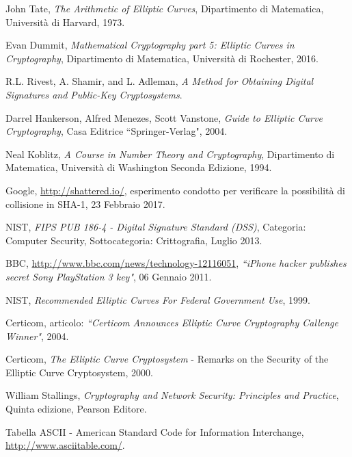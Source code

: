 \documentclass[a4paper,12pt]{tesiinfo}
\begin{document}
\begin{thebibliography}{99}
  John Tate,
  \emph{The Arithmetic of Elliptic Curves},
   Dipartimento di Matematica,
   Universit\`a di Harvard,
  1973.
  
  Evan Dummit,
  \emph{Mathematical Cryptography part 5: Elliptic Curves in Cryptography},
   Dipartimento di Matematica,
   Universit\`a di Rochester,
  2016.
  
  R.L. Rivest, A. Shamir, and L. Adleman,
  \emph{A Method for Obtaining Digital
Signatures and Public-Key Cryptosystems}.
  
  Darrel Hankerson, Alfred Menezes, Scott Vanstone,
  \emph{Guide to Elliptic
Curve Cryptography},
   Casa Editrice ``Springer-Verlag",
  2004.

  Neal Koblitz, 
  \emph{A Course in
Number Theory
and Cryptography},
Dipartimento di Matematica, 
Universit\`a di Washington
   Seconda Edizione,
   1994.
  
  Google, 
  \url{http://shattered.io/},
esperimento condotto per verificare la possibilit\`a di collisione in SHA-1,
23 Febbraio 2017.
  
  NIST, 
  \emph{FIPS PUB 186-4 - Digital Signature Standard (DSS)},
  Categoria: Computer Security,
  Sottocategoria: Crittografia,
  Luglio 2013.
  
  BBC, 
  \url{http://www.bbc.com/news/technology-12116051},
  \emph{``iPhone hacker publishes secret Sony PlayStation 3 key"},
  06 Gennaio 2011.
  
  NIST, 
  \emph{Recommended Elliptic Curves For Federal Government Use},
  1999.
  
  Certicom, articolo:
  \emph{``Certicom Announces Elliptic Curve Cryptography Callenge Winner"},
  2004.

  
  Certicom,
  \emph{The Elliptic Curve Cryptosystem} - Remarks on the Security of the Elliptic Curve Cryptosystem,
  2000.

  
  William Stallings,
  \emph{Cryptography and Network Security: Principles and Practice},
  Quinta edizione,
  Pearson Editore.
  
  Tabella ASCII - American Standard Code for Information Interchange,
  \url{http://www.asciitable.com/}.
  

\end{thebibliography}
\end{document}
